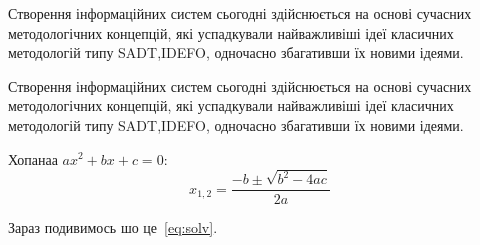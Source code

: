 \documentclass{lib/styles/default-style}
\begin{document}
Створення  інформаційних  систем  сьогодні  здійснюється  
на  основі сучасних  методологічних  концепцій,
які  успадкували  найважливіші  ідеї класичних методологій типу
SADT,IDEFO, одночасно збагативши їх новими ідеями.

Створення  інформаційних  систем  сьогодні  здійснюється  
на  основі сучасних  методологічних  концепцій,
які  успадкували  найважливіші  ідеї класичних методологій типу
SADT,IDEFO, одночасно збагативши їх новими ідеями.

Хопанаа \(ax^2+bx+c=0\):
\begin{equation}\label{eq:solv}
 x_{1,2}=\frac{-b\pm\sqrt{b^2-4ac}}{2a}
\end{equation}
 
Зараз подивимось шо це~\eqref{eq:solv}.


\end{document}
